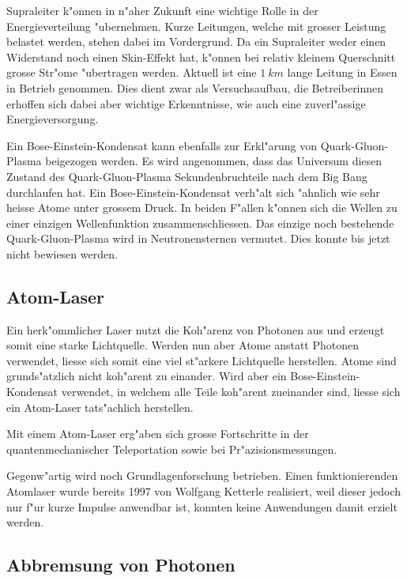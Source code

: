 \begin{refsection}
Supraleiter k"onnen in n"aher Zukunft eine wichtige Rolle in der Energieverteilung "ubernehmen. Kurze Leitungen, welche mit grosser Leistung belastet werden, stehen dabei im Vordergrund. Da ein Supraleiter weder einen Widerstand noch einen Skin-Effekt hat, k"onnen bei relativ kleinem Querschnitt grosse Str"ome "ubertragen werden. 
Aktuell ist eine $1~km$ lange Leitung in Essen in Betrieb genommen. Dies dient zwar als Versuchsaufbau, die Betreiberinnen erhoffen sich dabei aber wichtige Erkenntnisse, wie auch eine zuverl"assige Energieversorgung. \cite{bose:SupraVerteilnetze}

Ein Bose-Einstein-Kondensat kann ebenfalls zur Erkl"arung von Quark-Gluon-Plasma beigezogen werden. Es wird angenommen, dass das Universum diesen Zustand des Quark-Gluon-Plasma Sekundenbruchteile nach dem Big Bang durchlaufen hat. Ein Bose-Einstein-Kondensat verh"alt sich "ahnlich wie sehr heisse Atome unter grossem Druck. In beiden F"allen k"onnen sich die Wellen zu einer einzigen Wellenfunktion zusammenschliessen. Das einzige noch bestehende Quark-Gluon-Plasma wird in Neutronensternen vermutet. Dies konnte bis jetzt nicht bewiesen werden. \cite{bose:MITvideo}

\subsection{Atom-Laser}
Ein herk"ommlicher Laser nutzt die Koh"arenz von Photonen aus und erzeugt somit eine starke Lichtquelle. Werden nun aber Atome anstatt Photonen verwendet, liesse sich somit eine viel st"arkere Lichtquelle herstellen. Atome sind grunds"atzlich nicht koh"arent zu einander. Wird aber ein Bose-Einstein-Kondensat verwendet, in welchem alle Teile koh"arent zueinander sind, liesse sich ein Atom-Laser tats"achlich herstellen.

Mit einem Atom-Laser erg"aben sich grosse Fortschritte in der quantenmechanischer Teleportation sowie bei Pr"azisionsmessungen.

Gegenw"artig wird noch Grundlagenforschung betrieben. Einen funktionierenden Atomlaser wurde bereits 1997 von Wolfgang Ketterle realisiert, weil dieser jedoch nur f"ur kurze Impulse anwendbar ist, konnten keine Anwendungen damit erzielt werden. 

\subsection{Abbremsung von Photonen}


\end{refsection}
